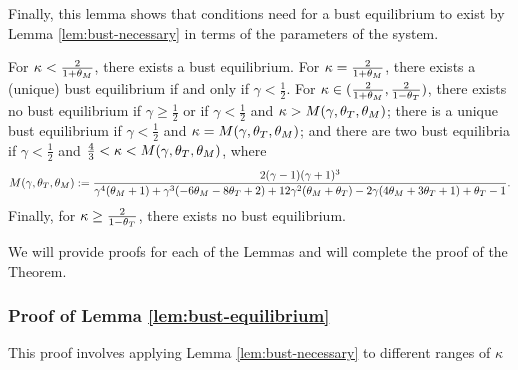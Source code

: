 Finally, this lemma shows that conditions need for a bust equilibrium to exist by Lemma \ref{lem:bust-necessary} in terms of the parameters of the system. 

\begin{lemma}\label{lem:bust-equilibrium} For $\kappa  <  \frac{2}{1+\tm }$, there exists a bust equilibrium. For $\kappa = \frac{2}{1+\tm}$, there exists a (unique) bust equilibrium if and only if $\gamma < \frac{1}{2}$.  For $\kappa \in (\frac{2}{1+\tm}, \frac{2}{1-\tt})$, there exists no bust equilibrium if $\gamma \geq \frac{1}{2}$ or if $\gamma < \frac{1}{2}$ and $\kappa > M(\gamma, \tt, \tm)$; there is a unique bust equilibrium if $\gamma < \frac{1}{2}$ and $\kappa = M(\gamma, \tt, \tm)$; and there are two bust equilibria if $\gamma < \frac{1}{2}$ and $\frac{4}{3} < \kappa < M(\gamma,\tt, \tm)$, where $$M(\gamma, \tt, \tm) :=  \frac{2 (\gamma-1) (\gamma+1)^3}{\gamma^4 (\tm+1)+\gamma^3 (-6 \tm-8 \tt+2)+12 \gamma^2 (\tm+\tt)-2 \gamma (4 \tm+3 \tt+1)+\tt-1}.$$ Finally, for $\kappa \geq \frac{2}{1-\tt}$, there exists no bust equilibrium.
\end{lemma}

We will provide proofs for each of the Lemmas and will complete the proof of the Theorem.




\subsubsection{Proof of Lemma \ref{lem:bust-equilibrium}}
This proof involves applying Lemma \ref{lem:bust-necessary} to different ranges of $\kappa$ 


